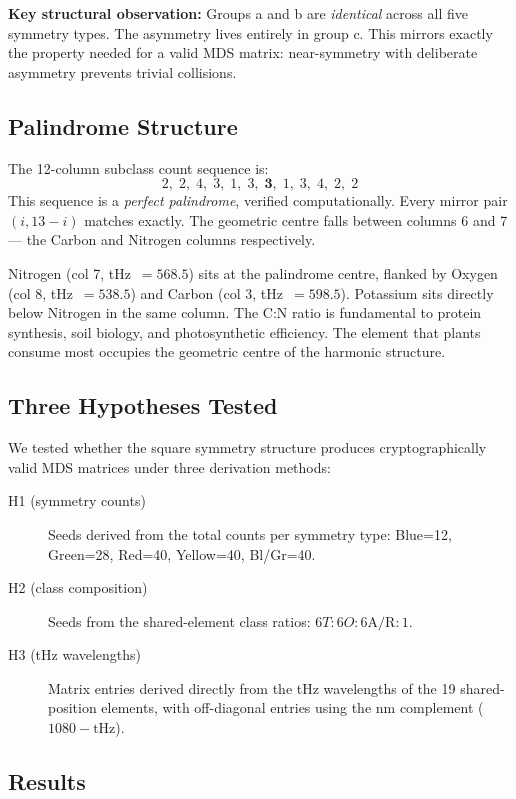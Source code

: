 \documentclass[preprint]{iacrtrans}
\begin{document}
\textbf{Key structural observation:} Groups a and b are \emph{identical} across
all five symmetry types. The asymmetry lives entirely in group c. This mirrors
exactly the property needed for a valid MDS matrix: near-symmetry with
deliberate asymmetry prevents trivial collisions.

\subsection{Palindrome Structure}

The 12-column subclass count sequence is:
\[
  2,\; 2,\; 4,\; 3,\; 1,\; 3,\; \mathbf{3},\; 1,\; 3,\; 4,\; 2,\; 2
\]
This sequence is a \emph{perfect palindrome}, verified computationally.
Every mirror pair $(i, 13-i)$ matches exactly. The geometric centre falls
between columns 6 and 7 — the Carbon and Nitrogen columns respectively.

Nitrogen (col 7, tHz~$= 568.5$) sits at the palindrome centre, flanked by
Oxygen (col 8, tHz~$= 538.5$) and Carbon (col 3, tHz~$= 598.5$).
Potassium sits directly below Nitrogen in the same column. The C:N ratio is
fundamental to protein synthesis, soil biology, and photosynthetic
efficiency. The element that plants consume most occupies the geometric
centre of the harmonic structure.

\subsection{Three Hypotheses Tested}

We tested whether the square symmetry structure produces cryptographically
valid MDS matrices under three derivation methods:

\begin{description}
\item[H1 (symmetry counts)] Seeds derived from the total counts per symmetry
  type: Blue=12, Green=28, Red=40, Yellow=40, Bl/Gr=40.
\item[H2 (class composition)] Seeds from the shared-element class ratios:
  $6T : 6O : 6\text{A/R} : 1$.
\item[H3 (tHz wavelengths)] Matrix entries derived directly from the tHz
  wavelengths of the 19 shared-position elements, with off-diagonal
  entries using the nm complement ($1080 - \text{tHz}$).
\end{description}

\subsection{Results}
\end{document}
